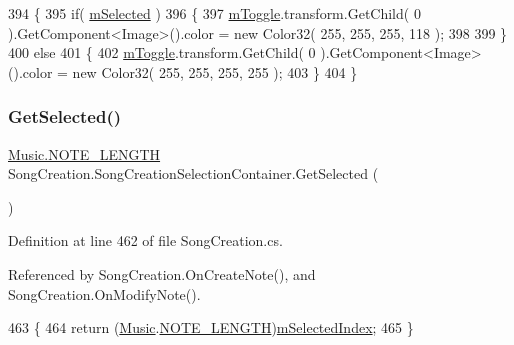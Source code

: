 \begin{DoxyCode}
394             \{
395                 \textcolor{keywordflow}{if}( \hyperlink{group___s_c_handlers_ga49ffd4516ec7982b1683a44b4f22de74}{mSelected} )
396                 \{
397                     \hyperlink{group___s_c_handlers_gaffc6248c907c4357b0a0a30b86635f3a}{mToggle}.transform.GetChild( 0 ).GetComponent<Image>().color = \textcolor{keyword}{new} Color32( 255, 
      255, 255, 118 );
398 
399                 \}
400                 \textcolor{keywordflow}{else}
401                 \{
402                     \hyperlink{group___s_c_handlers_gaffc6248c907c4357b0a0a30b86635f3a}{mToggle}.transform.GetChild( 0 ).GetComponent<Image>().color = \textcolor{keyword}{new} Color32( 255, 
      255, 255, 255 );
403                 \}
404             \}
\end{DoxyCode}
\mbox{\label{group___s_c_handlers_gac1a7dd19ee5cf14d87a09e803432acd1}} 
\subsubsection{\texorpdfstring{Get\+Selected()}{GetSelected()}}
{\footnotesize\ttfamily \hyperlink{group___music_enums_gaf11b5f079adbb21c800b9eca1c5c3cbd}{Music.\+N\+O\+T\+E\+\_\+\+L\+E\+N\+G\+TH} Song\+Creation.\+Song\+Creation\+Selection\+Container.\+Get\+Selected (\begin{DoxyParamCaption}{ }\end{DoxyParamCaption})}



Definition at line 462 of file Song\+Creation.\+cs.



Referenced by Song\+Creation.\+On\+Create\+Note(), and Song\+Creation.\+On\+Modify\+Note().


\begin{DoxyCode}
463         \{
464             \textcolor{keywordflow}{return} (\hyperlink{class_music}{Music}.\hyperlink{group___music_enums_gaf11b5f079adbb21c800b9eca1c5c3cbd}{NOTE\_LENGTH})\hyperlink{group___s_c_handlers_ga33015c7ac7e8cebb24b1fc97c70b4ed7}{mSelectedIndex};
465         \}
\end{DoxyCode}
\mbox{\label{group___s_c_handlers_gac7a3634aba275f03dffe9f45e444dbf1}} 
